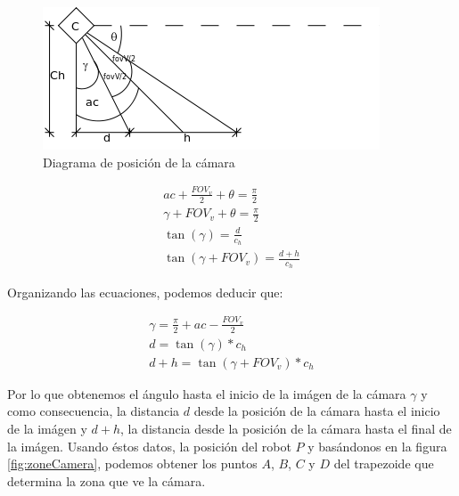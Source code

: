 \begin{figure}[htp]
\begin{center}
\includegraphics{comportamientos/angleCamera.png}
\caption{Diagrama de posici\'on de la c\'amara}
\label{fig:angleCamera}
\end{center}
\end{figure}

\begin{eqnarray}
ac + \frac{FOV_v}{2} + \theta = \frac{\pi}{2}\\
\gamma + FOV_v + \theta = \frac{\pi}{2}\\
\tan(\gamma) = \frac{d}{c_h}\\
\tan(\gamma+FOV_v) = \frac{d+h}{c_h}
\end{eqnarray}

Organizando las ecuaciones, podemos deducir que:

\begin{eqnarray}
\gamma = \frac{\pi}{2} + ac - \frac{FOV_v}{2}\\
\label{eqn:distance_d}
d = \tan(\gamma) * c_h \\
\label{eqn:distance_dh}
d+h = \tan(\gamma+FOV_v) * c_h
\end{eqnarray}

Por lo que obtenemos el \'angulo hasta el inicio de la im\'agen de la c\'amara $\gamma$ y como consecuencia,
la distancia $d$ desde la posici\'on de la c\'amara hasta el inicio de la im\'agen y $d+h$,
la distancia desde la posici\'on de la c\'amara hasta el final de la im\'agen. Usando \'estos
datos, la posici\'on del robot $P$ y bas\'andonos en la figura \ref{fig:zoneCamera}, podemos obtener
los puntos $A$, $B$, $C$ y $D$ del trapezoide que determina la zona que ve la c\'amara.

